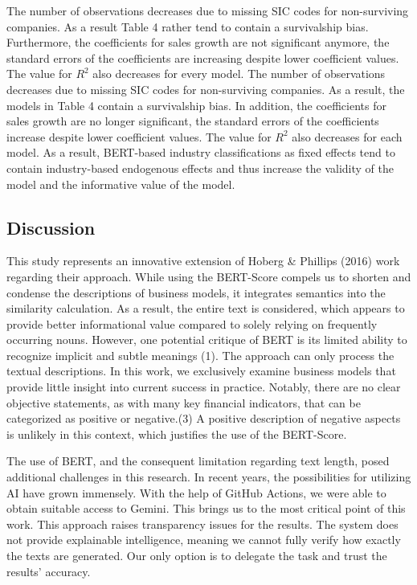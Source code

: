 \documentclass[
]{article}
\begin{document}
The number of observations decreases due to missing SIC codes for
non-surviving companies. As a result Table 4 rather tend to contain a
survivalship bias. Furthermore, the coefficients for sales growth are
not significant anymore, the standard errors of the coefficients are
increasing despite lower coefficient values. The value for \(R^2\) also
decreases for every model. The number of observations decreases due to
missing SIC codes for non-surviving companies. As a result, the models
in Table 4 contain a survivalship bias. In addition, the coefficients
for sales growth are no longer significant, the standard errors of the
coefficients increase despite lower coefficient values. The value for
\(R^2\) also decreases for each model. As a result, BERT-based industry
classifications as fixed effects tend to contain industry-based
endogenous effects and thus increase the validity of the model and the
informative value of the model.

\newpage{}

\subsection{Discussion}\label{discussion}

This study represents an innovative extension of Hoberg \& Phillips
(2016) work regarding their approach. While using the BERT-Score compels
us to shorten and condense the descriptions of business models, it
integrates semantics into the similarity calculation. As a result, the
entire text is considered, which appears to provide better informational
value compared to solely relying on frequently occurring nouns. However,
one potential critique of BERT is its limited ability to recognize
implicit and subtle meanings (1). The approach can only process the
textual descriptions. In this work, we exclusively examine business
models that provide little insight into current success in practice.
Notably, there are no clear objective statements, as with many key
financial indicators, that can be categorized as positive or
negative.(3) A positive description of negative aspects is unlikely in
this context, which justifies the use of the BERT-Score.

The use of BERT, and the consequent limitation regarding text length,
posed additional challenges in this research. In recent years, the
possibilities for utilizing AI have grown immensely. With the help of
GitHub Actions, we were able to obtain suitable access to Gemini. This
brings us to the most critical point of this work. This approach raises
transparency issues for the results. The system does not provide
explainable intelligence, meaning we cannot fully verify how exactly the
texts are generated. Our only option is to delegate the task and trust
the results' accuracy.
\end{document}
